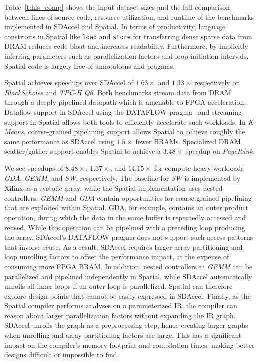Table~\ref{t:hls_comp} shows the input dataset sizes and the full comparison between lines of source code, resource utilization, and runtime of the benchmarks implemented in SDAccel and Spatial.
In terms of productivity, language constructs in Spatial like \texttt{\small{load}} and \texttt{\small{store}} for transferring dense sparse data from DRAM reduces code bloat and increases readability.
Furthermore, by implicitly
inferring parameters such as parallelization factors and loop initiation intervals, Spatial code is largely free of annotations and pragmas.

Spatial achieves speedups over SDAccel of $1.63\times$ and $1.33\times$ respectively on \emph{BlackScholes} and \emph{TPC-H Q6}. Both benchmarks
stream data from DRAM through a deeply pipelined datapath which is amenable to FPGA acceleration. Dataflow support in SDAccel using the DATAFLOW pragma~\cite{dataflowRef} and streaming support in Spatial allows both tools to efficiently accelerate such workloads. In \emph{K-Means}, coarse-grained pipelining support allows Spatial to achieve roughly the same performance as SDAccel using $1.5\times$ fewer BRAMs.
Specialized DRAM scatter/gather support enables Spatial to achieve a $3.48\times$ speedup on \emph{PageRank}.

We see speedups of $8.48\times$, $1.37\times$, and $14.15\times$ for compute-heavy workloads \emph{GDA}, \emph{GEMM}, and \emph{SW}, respectively. The baseline for \emph{SW} is implemented by Xilinx as a systolic array, while the Spatial implementation uses nested controllers. \emph{GEMM} and \emph{GDA} contain opportunities for coarse-grained pipelining that are exploited within Spatial.
GDA, for example, contains an outer product operation, during which the data in the same buffer is repeatedly accessed and reused. While this operation can be pipelined with a preceding loop producing the array, SDAccel's DATAFLOW pragma does not support such access patterns that involve reuse. As a result, SDAccel requires larger array partitioning and loop unrolling factors to offset the performance impact, at the expense of consuming more FPGA BRAM.
In addition, nested controllers in \emph{GEMM}
can be parallelized and pipelined independently in Spatial, while SDAccel automatically unrolls all inner loops if an outer loop is parallelized. Spatial can therefore explore
design points that cannot be easily expressed in SDAccel. Finally, as the Spatial compiler performs analyses on a parameterized IR, the compiler can reason about larger parallelization factors without expanding the IR graph.
SDAccel unrolls the graph as a preprocessing step, hence creating larger graphs when unrolling and array partitioning factors are large.
This has a significant impact on the compiler's memory footprint and compilation times, making better designs difficult or impossible to find.

